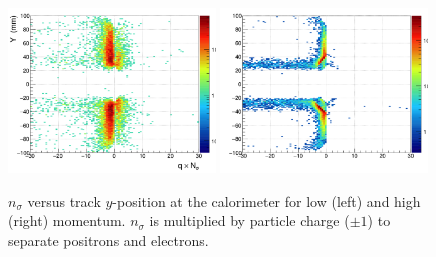\documentclass[amsmath,amssymb,notitlepage,12pt]{revtex4-1}
\begin{document}
\begin{figure}[htbp]\centering
    \includegraphics[width=0.49\textwidth]{pics/qnsyplo}
    \includegraphics[width=0.49\textwidth]{pics/qnsyphi}
    \caption{$n_\sigma$ versus track $y$-position at the calorimeter for low (left) and high (right) momentum.  $n_\sigma$ is multiplied by particle charge ($\pm1$) to separate positrons and electrons.\label{fig:nsigmay}}
\end{figure}
\end{document}
